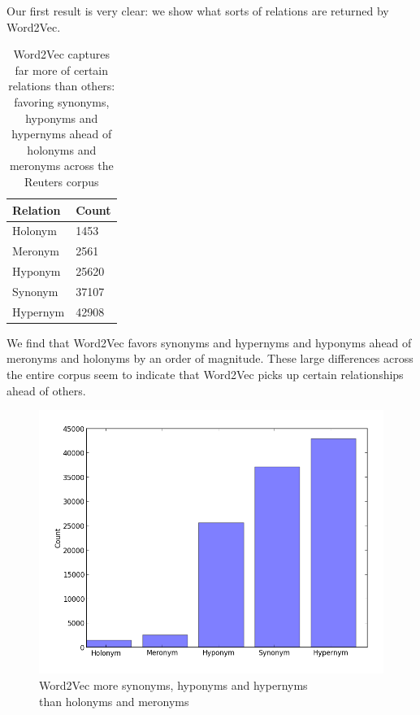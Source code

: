 \documentclass[titlepage]{article}
\begin{document}
Our first result is very clear: we show what sorts of relations are returned by Word2Vec. 

\begin{table}[ht]
\centering
\begin{tabular}{|l|l|}
\hline
Relation & Count \\  \hline
Holonym &  1453 \\  \hline
Meronym &  2561 \\  \hline
Hyponym &  25620 \\  \hline
Synonym &  37107 \\  \hline
Hypernym & 42908 \\  \hline
\end{tabular}
\captionsetup{justification=centering,margin=2cm}
\caption{Word2Vec captures far more of certain relations than others: \\ favoring synonyms, hyponyms and hypernyms ahead of holonyms and meronyms across the Reuters corpus}
\label{tab:my_label}
\end{table}

We find that Word2Vec favors synonyms and hypernyms and hyponyms ahead of meronyms and holonyms by an order of magnitude. These large differences across the entire corpus seem to indicate that Word2Vec picks up certain relationships ahead of others.

\begin{center}
\centering
\begin{figure}[!htbp]
  \centering
  \includegraphics[scale=.5]{grand_total.png}
  \caption{Word2Vec more synonyms, hyponyms and hypernyms \\ than holonyms and meronyms}
  \label{fig:grand_total}
\end{figure}
\end{center}
\end{document}
